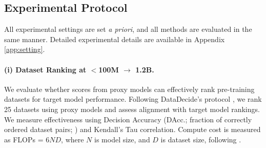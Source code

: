 
\subsection{Experimental Protocol}\label{sec:protocol}

All experimental settings are set \textit{a priori}, and all methods are evaluated in the same manner. Detailed experimental details are available in Appendix \ref{app:setting}.


\paragraph{(i) Dataset Ranking at $<$100M $\rightarrow$ 1.2B.} We evaluate whether  scores from proxy models can effectively rank pre-training datasets for target model performance. Following DataDecide's protocol \citep{magnusson2025datadecide}, we rank 25 datasets using proxy models and assess alignment with target model rankings. We measure effectiveness using Decision Accuracy (DAcc.; fraction of correctly ordered dataset pairs; \cite{magnusson2025datadecide}) and Kendall's Tau correlation. Compute cost is measured as FLOPs = $6ND$, where $N$ is model size, and $D$ is dataset size, following \cite{kaplan2020scaling}.

